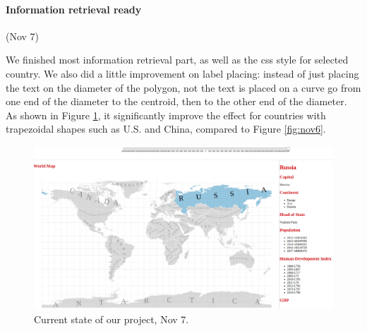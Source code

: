 \documentclass[12pt, fullpage,letterpaper]{article}
\begin{document}
\newpage
\paragraph{Information retrieval ready} (Nov 7)

We finished most information retrieval part, as well as the css style for selected country.
We also did a little improvement on label placing:
instead of just placing the text on the diameter of the polygon, not the text is placed on a curve
go from one end of the diameter to the centroid, then to the other end of the diameter.
As shown in Figure \ref{fig:nov7}, it significantly improve the effect for countries with trapezoidal shapes such as U.S. and China, compared
to Figure \ref{fig:nov6}.

\begin{figure}[h!]
    \begin{center}
        \includegraphics[width=\textwidth]{figs/Nov7.jpg}
        \caption{Current state of our project, Nov 7.}
        \label{fig:nov7}
    \end{center}
\end{figure}
\end{document}
